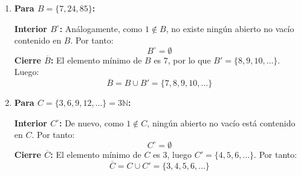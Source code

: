 \begin{sol}
\begin{enumerate}[label=\arabic*)]
        \textbf{Interior $A^\circ$:} Como todos los abiertos propios no vacíos contienen obligatoriamente al $1 \notin A$, ningún abierto no vacío puede estar contenido en $A$. Por tanto:
          \[ A^\circ = \emptyset \]
        \textbf{Cierre $\overline{A}$:} $\overline{A} = A \cup A' = \{4, 13, 23, 37\} \cup \{5, 6, 7, \dots\} = \{4, 5, 6, 7, \dots\}$.

        \medskip

        \item \textbf{Para $B = \{7, 24, 85\}$:}
        
        \textbf{Interior $B^\circ$:} Análogamente, como $1 \notin B$, no existe ningún abierto no vacío contenido en $B$. Por tanto:
          \[ B^\circ = \emptyset \]
        \textbf{Cierre $\overline{B}$:} El elemento mínimo de $B$ es $7$, por lo que $B' = \{8, 9, 10, \dots\}$. Luego:
          \[ \overline{B} = B \cup B' = \{7, 8, 9, 10, \dots\} \]

        \medskip

        \item \textbf{Para $C = \{3, 6, 9, 12, \dots\} = 3\mathbb{N}$:}
        
        \textbf{Interior $C^\circ$:} De nuevo, como $1 \notin C$, ningún abierto no vacío está contenido en $C$. Por tanto:
          \[ C^\circ = \emptyset \]
        \textbf{Cierre $\overline{C}$:} El elemento mínimo de $C$ es $3$, luego $C' = \{4, 5, 6, \dots\}$. Por tanto:
          \[ \overline{C} = C \cup C' = \{3, 4, 5, 6, \dots\} \]
    \end{enumerate}
\end{sol}

